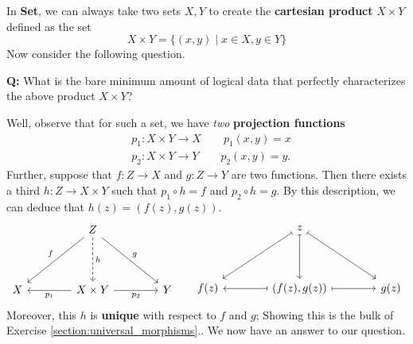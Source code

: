     \begin{example}
        In \textbf{Set}, we can always take two sets $X, Y$ to create  
        the \textbf{cartesian  product} $X \times Y$ defined as the set 
        \[
            X \times Y  =  \bigg\{ (x,y)  \;\bigg|\; x \in X, y \in Y \bigg\}
        \]
        Now consider the following question.
        \begin{center}
            \begin{minipage}{0.8\textwidth}
                \textbf{Q:}
                What 
                is the bare minimum amount of logical data that perfectly characterizes 
                the above product $X \times Y$?  
            \end{minipage}
        \end{center}
        Well, observe that for such a set, we have \emph{two} \textbf{projection 
        functions} 
        \begin{align*}
            &p_1: X \times Y \to X \qquad p_1(x, y) = x\\
            &p_2: X \times Y \to Y \qquad p_2(x, y) = y.
        \end{align*}
        Further, suppose that $f: Z \to X$ and $g: Z \to Y$ are two functions. 
        Then there exists a third $h: Z \to X \times Y$ such that $p_1\circ h = f$
        and $p_2\circ h = g$. By this description, we can deduce that 
        $h(z) = (f(z), g(z))$.
        \begin{align}\label{diagram:cartesian_product}
            \begin{tikzcd}[column sep = 1.4cm, row sep = 1.4cm
                ,ampersand replacement=\&]
                \&
                Z 
                \arrow[dr,  "g"]
                \arrow[dl, swap,"f"]
                \arrow[d, dashed, "h"]
                \&
                \\
                X 
                \& 
                \arrow[l, "p_1"]
                X \times Y 
                \arrow[r, swap, "p_2"]
                \&
                Y
            \end{tikzcd}
            \hspace{0.5cm}
            \begin{tikzcd}[column sep = 1.4cm, row sep = 1.4cm
                ,ampersand replacement=\&]
                \&
                z
                \arrow[dr, maps to]
                \arrow[dl, maps to]
                \arrow[d, maps to]
                \&
                \\
                f(z) 
                \& 
                \arrow[l, maps to]
                (f(z), g(z))
                \arrow[r, maps to]
                \&
                g(z)
            \end{tikzcd}
        \end{align}
        Moreover, this $h$ is \textbf{unique} with respect to $f$ and $g$; Showing this is the bulk of 
        Exercise \ref{section:universal_morphisms}.\exerciseCartesianProduct.
        We now have an answer to our question.


\end{example}
